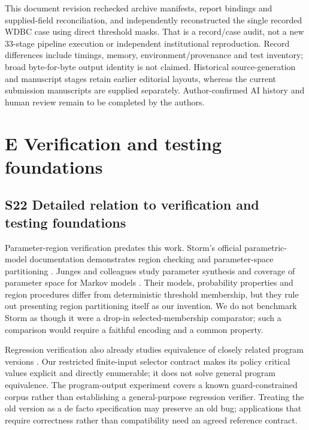 \documentclass[11pt,a4paper]{article}
\theoremstyle{plain}
\theoremstyle{definition}
\theoremstyle{remark}
\begin{document}
This document revision rechecked archive manifests, report bindings and supplied-field reconciliation, and independently reconstructed the single recorded WDBC case using direct threshold masks. That is a record/case audit, not a new 33-stage pipeline execution or independent institutional reproduction. Record differences include timings, memory, environment/provenance and test inventory; broad byte-for-byte output identity is not claimed. Historical source-generation and manuscript stages retain earlier editorial layouts, whereas the current submission manuscripts are supplied separately. Author-confirmed AI history and human review remain to be completed by the authors.


\section*{E Verification and testing foundations}


\subsection*{S22 Detailed relation to verification and testing foundations}\label{sec:s22}

Parameter-region verification predates this work. Storm's official parametric-model documentation demonstrates region checking and parameter-space partitioning \cite{storm2026parametric}. Junges and colleagues study parameter synthesis and coverage of parameter space for Markov models \cite{junges2024parameter}. Their models, probability properties and region procedures differ from deterministic threshold membership, but they rule out presenting region partitioning itself as our invention. We do not benchmark Storm as though it were a drop-in selected-membership comparator; such a comparison would require a faithful encoding and a common property.

Regression verification also already studies equivalence of closely related program versions \cite{godlin2009regression}. Our restricted finite-input selector contract makes its policy critical values explicit and directly enumerable; it does not solve general program equivalence. The program-output experiment covers a known guard-constrained corpus rather than establishing a general-purpose regression verifier. Treating the old version as a de facto specification may preserve an old bug; applications that require correctness rather than compatibility need an agreed reference contract.
\end{document}
